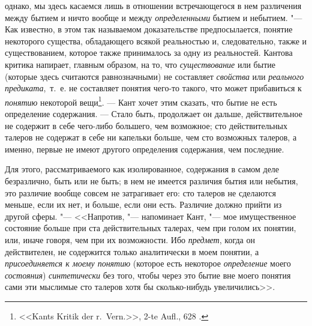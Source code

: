 однако, мы здесь касаемся лишь в отношении встречающегося в нем различения
между бытием и ничто вообще и между {\em определенными}
бытием и небытием. "--- Как известно, в этом так называемом доказательстве
предпосылается, понятие некоторого существа, обладающего всякой реальностью
и, следовательно, также и существованием, которое также принималось за одну
из реальностей. Кантова критика напирает, главным образом, на то, что
{\em существование} или бытие (которые здесь считаются
равнозначными) не составляет {\em свойства} или
{\em реального предиката},~т.~е. не составляет понятия
чего-то такого, что может прибавиться к {\em понятию}
некоторой вещи\footnote{ <<Kants Kritik der r.~Vern.>>, 2-te Aufl., 628
.}. --- Кант хочет этим сказать, что бытие не
есть определение содержания. --- Стало быть, продолжает он дальше,
действительное не содержит в себе чего-либо большего, чем возможное; сто
действительных талеров не содержат в себе ни капельки больше, чем сто
возможных талеров, а именно, первые не имеют другого определения
содержания, чем последние.

Для этого, рассматриваемого как изолированное, содержания в самом деле
безразлично, быть или не быть; в нем не имеется различия бытия или небытия,
это различие вообще совсем не затрагивает его: сто талеров не сделаются
меньше, если их нет, и больше, если они есть. Различие должно прийти из
другой сферы. "--- <<Напротив, "--- напоминает Кант, "--- мое имущественное состояние
больше при ста действительных талерах, чем при голом их понятии, или, иначе
говоря, чем при их возможности. Ибо {\em предмет},
когда он действителен, не содержится только аналитически в моем понятии, а
{\em присоединяется к моему понятию} (которое есть
некоторое {\em определение} моего
{\em состояния}) {\em синтетически}
без того, чтобы через это бытие вне моего понятия сами эти мыслимые сто
талеров хотя бы сколько-нибудь увеличились>>.


